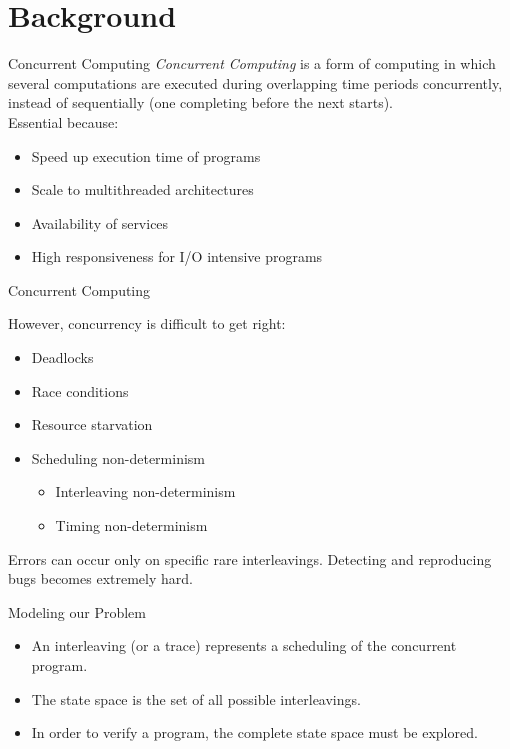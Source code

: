 \documentclass[9pt]{beamer}
\begin{document}
\section{Background}
\begin{frame}{Concurrent Computing}
\emph{Concurrent Computing} is a form of computing in which several computations are executed during
overlapping time periods concurrently, instead of sequentially (one completing before the next starts).
\\

Essential because:
\pause
\begin{itemize}[<+->]
    \item Speed up execution time of programs
    \item Scale to multithreaded architectures 
    \item Availability of services
    \item High responsiveness for I/O intensive programs
\end{itemize}

\end{frame}

\begin{frame}{Concurrent Computing}

However, concurrency is difficult to get right:
\pause
\begin{itemize}[<+->]
    \item Deadlocks
    \item Race conditions
    \item Resource starvation 
    \item Scheduling non-determinism
    \begin{itemize}[<+->]
        \item Interleaving non-determinism
        \item Timing non-determinism
    \end{itemize}
\end{itemize}
\pause
Errors can occur only on specific rare interleavings. 
Detecting and reproducing bugs becomes extremely hard.

\end{frame}

\begin{frame}{Modeling our Problem}

\begin{itemize}[<+->]
    \item An interleaving (or a trace) represents a scheduling of the concurrent program.
    \item The state space is the set of all possible interleavings.
    \item In order to verify a program, the complete state space must be explored.
\end{itemize}
    

\end{frame}
\end{document}
